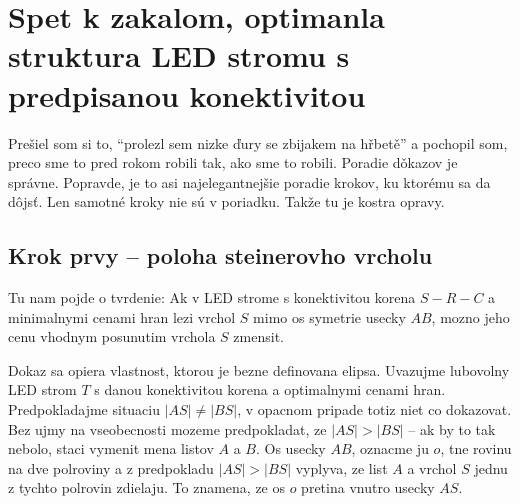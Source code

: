 \documentclass[12pt]{book}
\begin{document}
\section{Spet k zakalom, optimanla struktura LED stromu s predpisanou konektivitou}

Prešiel som si to, ``prolezl sem nizke ďury se zbijakem na hřbetě'' a pochopil
    som, preco sme to pred rokom robili tak, ako sme to robili.
Poradie dǒkazov je správne.
Popravde, je to asi najelegantnejšie poradie krokov, ku ktorému sa da dôjsť.
Len samotné kroky nie sú v poriadku.
Takže tu je kostra opravy.

\subsection{Krok prvy -- poloha steinerovho vrcholu}

Tu nam pojde o tvrdenie:
Ak v LED strome s konektivitou korena $S-R-C$ a minimalnymi cenami hran
    lezi vrchol $S$ mimo os symetrie usecky $AB$, mozno jeho cenu vhodnym
    posunutim vrchola $S$ zmensit.

Dokaz sa opiera vlastnost, ktorou je bezne definovana elipsa.
Uvazujme lubovolny LED strom $T$ s danou konektivitou korena a optimalnymi
    cenami hran.
Predpokladajme situaciu $|AS|\not=|BS|$, v opacnom pripade totiz niet co
    dokazovat.
Bez ujmy na vseobecnosti mozeme predpokladat, ze $|AS|>|BS|$ -- ak by to tak
    nebolo, staci vymenit mena listov $A$ a $B$.
Os usecky $AB$, oznacme ju $o$, tne rovinu na dve polroviny a z predpokladu
    $|AS|>|BS|$ vyplyva, ze list $A$ a vrchol $S$ jednu z tychto polrovin
    zdielaju.
To znamena, ze os $o$ pretina vnutro usecky $AS$.
\end{document}
